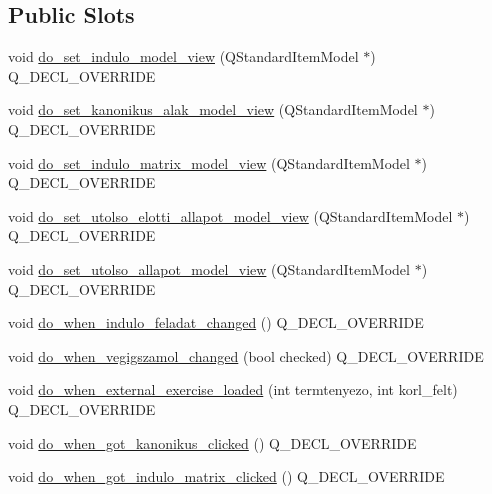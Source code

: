 \subsection*{Public Slots}
\begin{DoxyCompactItemize}
\item 
void \hyperlink{classMainvindow__gui__plugin_a51be893d4ce6d2f88269b7c5de29dee1}{do\+\_\+set\+\_\+indulo\+\_\+model\+\_\+view} (Q\+Standard\+Item\+Model $\ast$) Q\+\_\+\+D\+E\+C\+L\+\_\+\+O\+V\+E\+R\+R\+I\+DE
\item 
void \hyperlink{classMainvindow__gui__plugin_a57e149b56d9cb9f0084c859fe4dfbc4b}{do\+\_\+set\+\_\+kanonikus\+\_\+alak\+\_\+model\+\_\+view} (Q\+Standard\+Item\+Model $\ast$) Q\+\_\+\+D\+E\+C\+L\+\_\+\+O\+V\+E\+R\+R\+I\+DE
\item 
void \hyperlink{classMainvindow__gui__plugin_a4be633148117ee9541d59733cd591dd7}{do\+\_\+set\+\_\+indulo\+\_\+matrix\+\_\+model\+\_\+view} (Q\+Standard\+Item\+Model $\ast$) Q\+\_\+\+D\+E\+C\+L\+\_\+\+O\+V\+E\+R\+R\+I\+DE
\item 
void \hyperlink{classMainvindow__gui__plugin_ad86b393bdcb1266fc78ad579c4fb22f8}{do\+\_\+set\+\_\+utolso\+\_\+elotti\+\_\+allapot\+\_\+model\+\_\+view} (Q\+Standard\+Item\+Model $\ast$) Q\+\_\+\+D\+E\+C\+L\+\_\+\+O\+V\+E\+R\+R\+I\+DE
\item 
void \hyperlink{classMainvindow__gui__plugin_a501eff78dd74f522383650aa90612d74}{do\+\_\+set\+\_\+utolso\+\_\+allapot\+\_\+model\+\_\+view} (Q\+Standard\+Item\+Model $\ast$) Q\+\_\+\+D\+E\+C\+L\+\_\+\+O\+V\+E\+R\+R\+I\+DE
\item 
void \hyperlink{classMainvindow__gui__plugin_ade84b9f3aabf1a82847eccc5ca868e15}{do\+\_\+when\+\_\+indulo\+\_\+feladat\+\_\+changed} () Q\+\_\+\+D\+E\+C\+L\+\_\+\+O\+V\+E\+R\+R\+I\+DE
\item 
void \hyperlink{classMainvindow__gui__plugin_a2c147430a48369193b3ac08128aca977}{do\+\_\+when\+\_\+vegigszamol\+\_\+changed} (bool checked) Q\+\_\+\+D\+E\+C\+L\+\_\+\+O\+V\+E\+R\+R\+I\+DE
\item 
void \hyperlink{classMainvindow__gui__plugin_a4ad9ff7c5361c013b272505503c21acb}{do\+\_\+when\+\_\+external\+\_\+exercise\+\_\+loaded} (int termtenyezo, int korl\+\_\+felt) Q\+\_\+\+D\+E\+C\+L\+\_\+\+O\+V\+E\+R\+R\+I\+DE
\item 
void \hyperlink{classMainvindow__gui__plugin_a144bcf420ee4a90d79eac642ffd66c54}{do\+\_\+when\+\_\+got\+\_\+kanonikus\+\_\+clicked} () Q\+\_\+\+D\+E\+C\+L\+\_\+\+O\+V\+E\+R\+R\+I\+DE
\item 
void \hyperlink{classMainvindow__gui__plugin_a1b835b4de00749d30479b17c58452c13}{do\+\_\+when\+\_\+got\+\_\+indulo\+\_\+matrix\+\_\+clicked} () Q\+\_\+\+D\+E\+C\+L\+\_\+\+O\+V\+E\+R\+R\+I\+DE

\end{DoxyCompactItemize}
